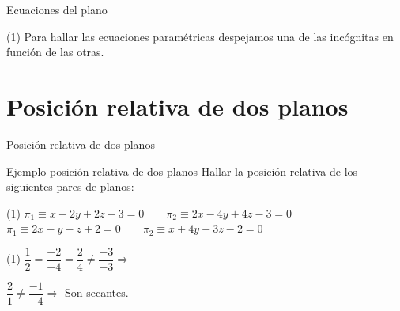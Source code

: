 \documentclass[8pt]{beamer}
\begin{document}
\begin{frame}[t]{Ecuaciones del plano}
\begin{tasks}[label=\alph*),resume](1)
\task Para hallar las ecuaciones paramétricas despejamos una de las incógnitas en función de las otras.

\end{tasks}
\end{frame}

\section{Posición relativa de dos planos}

\begin{frame}[t]{Posición relativa de dos planos}
\begin{exampleblock}{Ejemplo posición relativa de dos planos}
Hallar la posición relativa de los siguientes pares de planos:
\begin{tasks}[label=\alph*)](1)
\task $\pi_1 \equiv x-2y+2z -3=0 \qquad \pi_2 \equiv 2x-4y+4z-3=0$
\task $\pi_1 \equiv 2x-y-z +2=0 \qquad \pi_2 \equiv x+4y-3z-2=0$
\end{tasks}
\end{exampleblock}

\begin{tasks}[label=\alph*)](1)
\task $\dfrac{1}{2}= \dfrac{-2}{-4}=\dfrac{2}{4}\neq \dfrac{-3}{-3} \Rightarrow $ 

\vspace{0.5cm}
\task $\dfrac{2}{1}\neq \dfrac{-1}{-4} \Rightarrow $
Son secantes.
\end{tasks}

\end{frame}
\end{document}
